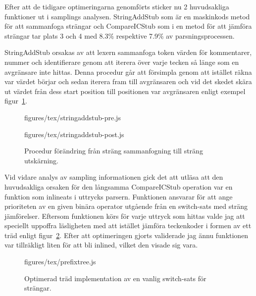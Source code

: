 Efter att de tidigare optimeringarna genomförts sticker nu 2 huvudsakliga
funktioner ut i samplings analysen. StringAddStub som är en maskinkods metod
för att sammanfoga strängar och CompareICStub som i en metod för att jämföra
strängar tar plats 3 och 4 med 8.3\% respektive 7.9\% av parsningsprocessen.

StringAddStub orsakas av att lexern sammanfoga token värden för kommentarer,
nummer och identifierare genom att iterera över varje tecken så länge som en
avgränsare inte hittas. Denna procedur går att försimpla genom att istället
räkna var värdet börjar och sedan iterera fram till avgränsaren och vid det
skedet skära ut värdet från dess start position till positionen var
avgränsaren enligt exempel figur~\ref{fig:stringAddStub}.

\begin{figure}[ht]
  \begin{minipage}[t]{0.5\textwidth}
      {figures/tex/stringaddstub-pre.js}
  \end{minipage}%
  \begin{minipage}[t]{0.5\textwidth}
      {figures/tex/stringaddstub-post.js}
  \end{minipage}
  \caption{Procedur förändring från sträng sammanfogning till sträng
  utskärning.}
  \label{fig:stringAddStub}
\end{figure}

Vid vidare analys av sampling informationen gick det att utläsa att den
huvudsakliga orsaken för den långsamma CompareICStub operation var en funktion
som inlineats i uttrycks parsern. Funktionen ansvarar för att ange prioriteten
av en given binära operator utgående från en switch-sats med sträng
jämförelser. Eftersom funktionen körs för varje uttryck som hittas valde jag
att speciellt uppoffra läsligheten med att istället jämföra teckenkoder i
formen av ett träd enligt figur~\ref{fig:switchtree}. Efter att
optimeringen gjorts validerade jag ännu funktionen var tillräkligt liten för
att bli inlined, vilket den visade sig vara.

\begin{figure}[ht]
    {figures/tex/prefixtree.js}
  \caption{Optimerad träd implementation av en vanlig switch-sats för
    strängar.} \label{fig:switchtree}
\end{figure}

